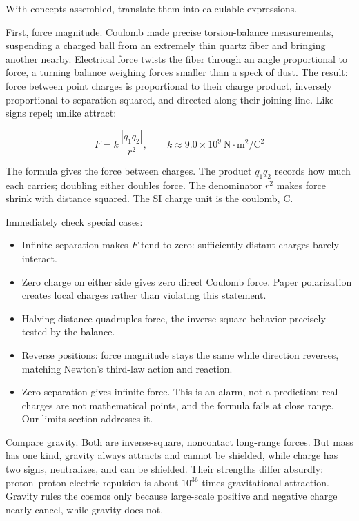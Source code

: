 \begin{mainline}
With concepts assembled, translate them into calculable expressions.

First, force magnitude. Coulomb made precise torsion-balance measurements, suspending a charged ball from an extremely thin quartz fiber and bringing another nearby. Electrical force twists the fiber through an angle proportional to force, a turning balance weighing forces smaller than a speck of dust. The result: force between point charges is proportional to their charge product, inversely proportional to separation squared, and directed along their joining line. Like signs repel; unlike attract:

\[ F = k\,\frac{|q_1 q_2|}{r^2},\qquad k \approx 9.0\times 10^{9}\ \mathrm{N\cdot m^2/C^2} \]

The formula gives the force between charges. The product \(q_1 q_2\) records how much each carries; doubling either doubles force. The denominator \(r^2\) makes force shrink with distance squared. The SI charge unit is the coulomb, C.

Immediately check special cases:

\begin{itemize}
  \item Infinite separation makes \(F\) tend to zero: sufficiently distant charges barely interact.
  \item Zero charge on either side gives zero direct Coulomb force. Paper polarization creates local charges rather than violating this statement.
  \item Halving distance quadruples force, the inverse-square behavior precisely tested by the balance.
  \item Reverse positions: force magnitude stays the same while direction reverses, matching Newton's third-law action and reaction.
  \item Zero separation gives infinite force. This is an alarm, not a prediction: real charges are not mathematical points, and the formula fails at close range. Our limits section addresses it.
\end{itemize}

Compare gravity. Both are inverse-square, noncontact long-range forces. But mass has one kind, gravity always attracts and cannot be shielded, while charge has two signs, neutralizes, and can be shielded. Their strengths differ absurdly: proton--proton electric repulsion is about \(10^{36}\) times gravitational attraction. Gravity rules the cosmos only because large-scale positive and negative charge nearly cancel, while gravity does not.


\end{mainline}

